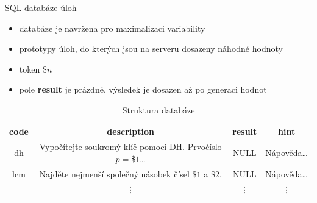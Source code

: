 \documentclass[aspectratio=1610]{beamer}
\begin{document}
\begin{frame}{SQL databáze úloh}
    \begin{itemize}
        \item databáze je navržena pro maximalizaci variability
        \item prototypy úloh, do kterých jsou na serveru dosazeny náhodné hodnoty
        \item token \textbf{$\$n$}
        \item pole \textbf{result} je prázdné, výsledek je dosazen až po generaci hodnot
    \end{itemize}
    \begin{table}
        \caption{Struktura databáze}
        \begin{tabular}[pos]{|c|c|c|c|}
            \hline
            \textbf{code} & \textbf{description} & \textbf{result} & \textbf{hint} \\
            \hline
            \hline
            dh & Vypočítejte soukromý klíč pomocí DH. Prvočíslo $p=\$1$\dots & NULL & Nápověda\dots \\
            \hline
            lcm & Najděte nejmenší společný násobek čísel $\$1$ a $\$2$. & NULL & Nápověda\dots \\
            \hline
            \smash{\vdots} & \vdots & \vdots & \vdots \\
            \hline
        \end{tabular}
    \end{table}
    
\end{frame}
\end{document}
